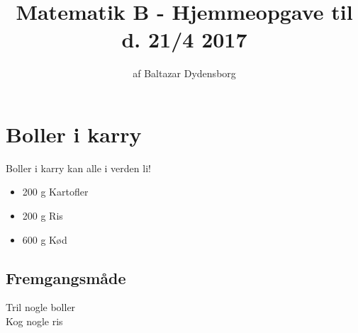 \documentclass[11pt, a4paper]{article}
\title{Matematik B - Hjemmeopgave til d. 21/4 2017}
\author{af Baltazar Dydensborg}
\begin{document}
\newenvironment{recipie}[4]{
	\section{#1}
	#2
	#3
	\subsection{Fremgangsmåde}
	#4
}
{}
	
	
	
\begin{recipie}{Boller i karry}{Boller i karry kan alle i verden li!}
	{	\begin{itemize}
			\item 200 g Kartofler
			\item 200 g Ris
			\item 600 g Kød
		\end{itemize}
	}
	{Tril nogle boller\\
		Kog nogle ris\\
		}
\end{recipie}
	
	
\end{document}
